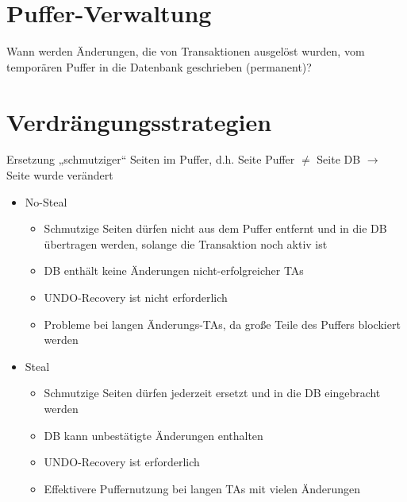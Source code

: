 \documentclass{lehramt-informatik-haupt}
\begin{document}
%

\section{Puffer-Verwaltung}

\cite[Seite 25]{db:fs:5}
\cite[Seite 305]{kemper}

Wann werden Änderungen, die von Transaktionen ausgelöst wurden, vom
temporären Puffer in die Datenbank geschrieben (permanent)?

%

\section{Verdrängungsstrategien}

Ersetzung „schmutziger“ Seiten im Puffer, d.h. Seite Puffer $\neq$ Seite
DB $\rightarrow$ Seite wurde verändert

\begin{itemize}

\item No-Steal

\begin{itemize}
\item Schmutzige Seiten dürfen nicht aus dem Puffer entfernt und in die
DB übertragen werden, solange die Transaktion noch aktiv ist

\item DB enthält keine Änderungen nicht-erfolgreicher TAs

\item UNDO-Recovery ist nicht erforderlich

\item Probleme bei langen Änderungs-TAs, da große Teile des Puffers
blockiert werden
\end{itemize}

\item Steal

\begin{itemize}
\item Schmutzige Seiten dürfen jederzeit ersetzt und in die DB
eingebracht werden

\item DB kann unbestätigte Änderungen enthalten

\item UNDO-Recovery ist erforderlich

\item Effektivere Puffernutzung bei langen TAs mit vielen Änderungen
\end{itemize}
\end{itemize}
\end{document}
